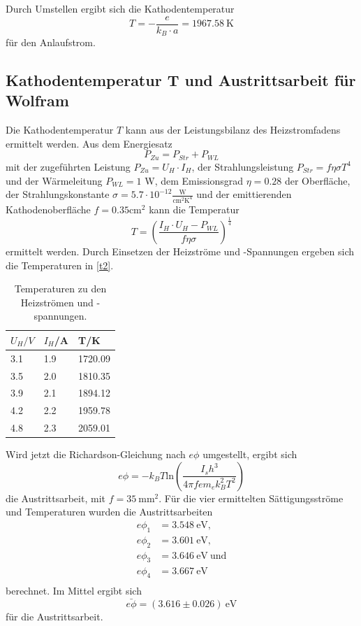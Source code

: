  Durch Umstellen ergibt sich die Kathodentemperatur 
 \begin{equation*}
   T=-\frac{e}{k_{B}\cdot a}=1967.58\ \textrm{K}
 \end{equation*}
 für den Anlaufstrom. 

 \subsection{Kathodentemperatur T und Austrittsarbeit für Wolfram}
 \label{sec:T2}
 Die Kathodentemperatur $T$ kann aus der Leistungsbilanz des Heizstromfadens ermittelt werden. Aus dem Energiesatz 
 \begin{equation*}
   P_{Zu}=P_{Str}+P_{WL}
 \end{equation*}
 mit der zugeführten Leistung $P_{Zu}=U_{H}\cdot I_{H}$, der Strahlungsleistung $P_{Str}=f\eta\sigma T^4$ und der Wärmeleitung $P_{WL}=1$ W, dem Emissionsgrad $\eta=0.28$ der Oberfläche, der Strahlungskonstante $\sigma=5.7\cdot 10^{-12} \frac{\textrm{W}}{\textrm{cm}^2\textrm{K}^4}$ und der emittierenden Kathodenoberfläche $f=0.35 \textrm{cm}^2$  kann die Temperatur
 \begin{equation*}
   T=\left(\frac{I_{H}\cdot U_{H}-P_{WL}}{f\eta\sigma}\right)^{\frac{1}{4}}
 \end{equation*}
 ermittelt werden. Durch Einsetzen der Heizströme und -Spannungen ergeben sich die Temperaturen in \autoref{t2}.
 \begin{table}[H]
 \centering
 \caption{Temperaturen zu den Heizströmen und -spannungen.}
 \begin{tabular}{l|l|l}
 $U_{H}/V$ & $I_{H}$/A & T/K\\ \hline
 3.1 & 1.9 & 1720.09\\
 3.5 & 2.0 & 1810.35\\
 3.9 & 2.1 & 1894.12\\
 4.2 & 2.2 & 1959.78\\
 4.8 & 2.3 & 2059.01
 \end{tabular}
 \label{t2}
 \end{table}
 Wird jetzt die Richardson-Gleichung nach $e\phi$ umgestellt, ergibt sich 
 \begin{equation*}
 e\phi=-k_{B}T\textrm{ln}(\frac{I_{s}h^3}{4\pi f em_{e}k_{B}^2T^2})
 \end{equation*}
 die Austrittsarbeit, mit $f=35\ \textrm{mm}^2$. Für die vier ermittelten Sättigungsströme und Temperaturen wurden die Austrittsarbeiten 
 \begin{align*}
   e\phi_{1}&=3.548\ \textrm{eV},\\
   e\phi_{2}&=3.601\ \textrm{eV},\\
   e\phi_{3}&=3.646\ \textrm{eV}\ \textrm{und}\\
   e\phi_{4}&=3.667\ \textrm{eV}\\
 \end{align*}
 berechnet. Im Mittel ergibt sich 
 \begin{equation*}
   \bar{e\phi}=(3.616 \pm 0.026)\ \textrm{eV}
 \end{equation*}
für die Austrittsarbeit.

